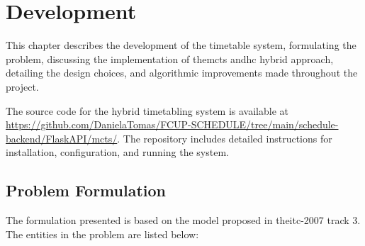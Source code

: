 \pretocmd{\chapter}{\glsresetall}{}{}


\chapter{Development}


\label{Development}

This chapter describes the development of the timetable system, formulating the problem, discussing the implementation of the\ac{mcts} and\ac{hc} hybrid approach, detailing the design choices, and algorithmic improvements made throughout the project. 

The source code for the hybrid timetabling system is available at \url{https://github.com/DanielaTomas/FCUP-SCHEDULE/tree/main/schedule-backend/FlaskAPI/mcts/}. The repository includes detailed instructions for installation, configuration, and running the system.

\section{Problem Formulation}

The formulation presented is based on the model proposed in the\ac{itc-2007} track 3. The entities in the problem are listed below:

